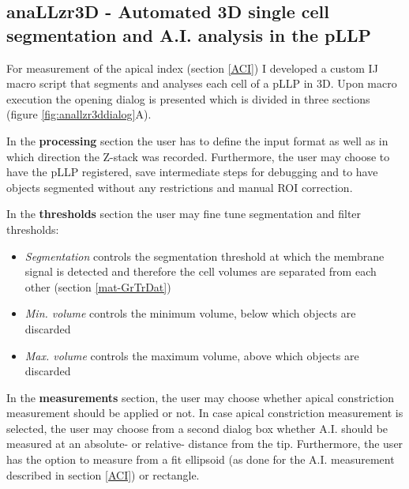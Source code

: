 \documentclass[11pt,singlespacinge,twoside]{reedthesis} %
\providecommand{\tightlist}{%
  \setlength{\itemsep}{0pt}\setlength{\parskip}{0pt}}
\theoremstyle{definition}
\theoremstyle{definition}
\theoremstyle{definition}
\theoremstyle{remark}
\begin{document}
\hypertarget{mat-anallzr3d}{%
\subsection{anaLLzr3D - Automated 3D single cell segmentation and A.I. analysis in the pLLP}\label{mat-anallzr3d}}

For measurement of the apical index (section \ref{ACI}) I developed a custom IJ macro script that segments and analyses each cell of a pLLP in 3D. Upon macro execution the opening dialog is presented which is divided in three sections (figure \ref{fig:anallzr3ddialog}A).

In the \textbf{processing} section the user has to define the input format as well as in which direction the Z-stack was recorded. Furthermore, the user may choose to have the pLLP registered, save intermediate steps for debugging and to have objects segmented without any restrictions and manual ROI correction.

In the \textbf{thresholds} section the user may fine tune segmentation and filter thresholds:
\begin{itemize}
\tightlist
\item
  \emph{Segmentation} controls the segmentation threshold at which the membrane signal is detected and therefore the cell volumes are separated from each other (section \ref{mat-GrTrDat})
\item
  \emph{Min. volume} controls the minimum volume, below which objects are discarded
\item
  \emph{Max. volume} controls the maximum volume, above which objects are discarded
\end{itemize}
In the \textbf{measurements} section, the user may choose whether apical constriction measurement should be applied or not. In case apical constriction measurement is selected, the user may choose from a second dialog box whether A.I. should be measured at an absolute- or relative- distance from the tip. Furthermore, the user has the option to measure from a fit ellipsoid (as done for the A.I. measurement described in section \ref{ACI}) or rectangle.
\end{document}
